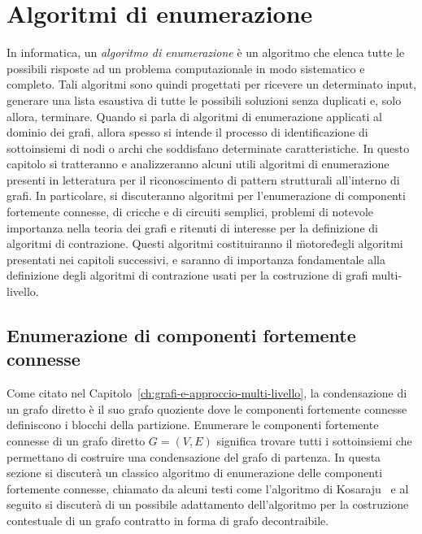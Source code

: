 \chapter{Algoritmi di enumerazione}\label{ch:algoritmi-di-enumerazione}

In informatica, un \textit{algoritmo di enumerazione} \`e un algoritmo che elenca tutte le possibili risposte ad un
problema computazionale in modo sistematico e completo. Tali algoritmi sono quindi progettati per ricevere un
determinato input, generare una lista esaustiva di tutte le possibili soluzioni senza duplicati e, solo allora,
terminare.
Quando si parla di algoritmi di enumerazione applicati al dominio dei grafi, allora spesso si intende il processo di
identificazione di sottoinsiemi di nodi o archi che soddisfano determinate caratteristiche.
In questo capitolo si tratteranno e analizzeranno alcuni utili algoritmi di enumerazione presenti in letteratura per
il riconoscimento di pattern strutturali all'interno di grafi.
In particolare, si discuteranno algoritmi per l'enumerazione di componenti fortemente connesse, di cricche e di
circuiti semplici, problemi di notevole importanza nella teoria dei grafi e ritenuti di interesse per la definizione
di algoritmi di contrazione.
Questi algoritmi costituiranno il \"motore\" degli algoritmi presentati nei capitoli successivi, e saranno di
importanza fondamentale alla definizione degli algoritmi di contrazione usati per la costruzione di grafi multi-livello.

\section{Enumerazione di componenti fortemente connesse}\label{subsec:enumerazione-di-componenti-fortemente-connesse}

Come citato nel Capitolo~\ref{ch:grafi-e-approccio-multi-livello}, la condensazione di un grafo diretto \`e il suo
grafo quoziente dove le componenti fortemente connesse definiscono i blocchi della partizione.
Enumerare le componenti fortemente connesse di un grafo diretto $G = (V, E)$ significa trovare tutti i sottoinsiemi
che permettano di costruire una condensazione del grafo di partenza.
In questa sezione si discuter\`a un classico algoritmo di enumerazione delle componenti fortemente connesse, chiamato
da alcuni testi come l'algoritmo di Kosaraju~\cite{SHARIR198167} e al seguito si discuter\`a di un possibile adattamento
dell'algoritmo per la costruzione contestuale di un grafo contratto in forma di grafo decontraibile.

